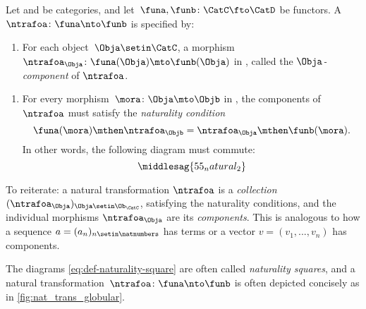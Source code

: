 \begin{ctdefinition}
    \label{def:natural-transformation}
    Let \CatC and \CatD be categories, and let~$\funa,\funb\colon \CatC\fto \CatD$ be functors.
    A \emph{}~$\ntrafoa \colon \funa\nto \funb$ is specified by:

    \constit
    \begin{enumerate}
        \item For each object~$\Obja\setin \CatC$, a morphism $\ntrafoa_\Obja \colon \funa(\Obja)\mto \funb(\Obja)$ in \CatD, called the $\Obja$\emph{-component} of $\ntrafoa$.
    \end{enumerate}
    \condit
    \begin{enumerate}
        \item For every morphism~$\mora\colon \Obja\mto \Objb$ in \CatC, the components of $\ntrafoa$ must satisfy the \emph{naturality condition}
              \begin{equation}
                  \funa(\mora)\mthen \ntrafoa_\Objb = \ntrafoa_\Obja\mthen \funb(\mora).
              \end{equation}
              In other words, the following diagram must commute:
              \begin{equation}
                  \label{eq:def-naturality-square}
                  \middlesag{55_natural_2}
              \end{equation}
    \end{enumerate}
\end{ctdefinition}

To reiterate: a natural transformation $\ntrafoa$ is a \emph{collection} $(\ntrafoa_\Obja)_{\Obja \setin \Ob_\CatC}$, satisfying the naturality conditions, and the individual morphisms $\ntrafoa_\Obja$ are its \emph{components}.
This is analogous to how a sequence $a = (a_n)_{n \setin \natnumbers}$ has terms or a vector $v = (v_1, .
    .. , v_n)$ has components.

The diagrams \cref{eq:def-naturality-square} are often called \emph{naturality squares}, and a natural transformation~$\ntrafoa \colon \funa\nto \funb$ is often depicted concisely as in \cref{fig:nat_trans_globular}.

\begin{marginfigure}
    \centering
    \caption{}
    \label{fig:nat_trans_globular}
\end{marginfigure}
\begin{figure}[h!]
    \centering
    \begin{ctdefinitionshade}
    \end{ctdefinitionshade}
    \caption{}
    \label{fig:nat_trans_graphically}
\end{figure}

